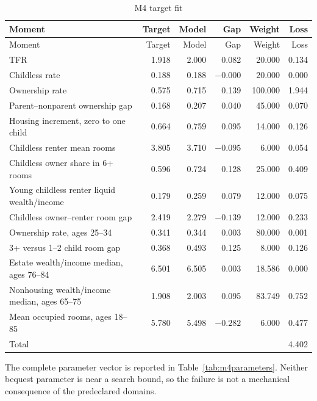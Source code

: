 \documentclass[10pt]{article}
\begin{document}
\begin{longtable}{p{}rrrrr}
\caption{M4 target fit}\label{tab:m4fit}\\
\toprule
Moment & Target & Model & Gap & Weight & Loss \\
\midrule
\endfirsthead
\toprule
Moment & Target & Model & Gap & Weight & Loss \\
\midrule
\endhead
TFR & 1.918 & 2.000 & 0.082 & 20.000 & 0.134 \\
Childless rate & 0.188 & 0.188 & $-0.000$ & 20.000 & 0.000 \\
Ownership rate & 0.575 & 0.715 & 0.139 & 100.000 & 1.944 \\
Parent--nonparent ownership gap & 0.168 & 0.207 & 0.040 & 45.000 & 0.070 \\
Housing increment, zero to one child & 0.664 & 0.759 & 0.095 & 14.000 & 0.126 \\
Childless renter mean rooms & 3.805 & 3.710 & $-0.095$ & 6.000 & 0.054 \\
Childless owner share in 6+ rooms & 0.596 & 0.724 & 0.128 & 25.000 & 0.409 \\
Young childless renter liquid wealth/income & 0.179 & 0.259 & 0.079 & 12.000 & 0.075 \\
Childless owner--renter room gap & 2.419 & 2.279 & $-0.139$ & 12.000 & 0.233 \\
Ownership rate, ages 25--34 & 0.341 & 0.344 & 0.003 & 80.000 & 0.001 \\
3+ versus 1--2 child room gap & 0.368 & 0.493 & 0.125 & 8.000 & 0.126 \\
Estate wealth/income median, ages 76--84 & 6.501 & 6.505 & 0.003 & 18.586 & 0.000 \\
Nonhousing wealth/income median, ages 65--75 & 1.908 & 2.003 & 0.095 & 83.749 & 0.752 \\
Mean occupied rooms, ages 18--85 & 5.780 & 5.498 & $-0.282$ & 6.000 & 0.477 \\
\midrule
Total & & & & & 4.402 \\
\bottomrule
\end{longtable}

The complete parameter vector is reported in Table~\ref{tab:m4parameters}.
Neither bequest parameter is near a search bound, so the failure is not a
mechanical consequence of the predeclared domains.
\end{document}
